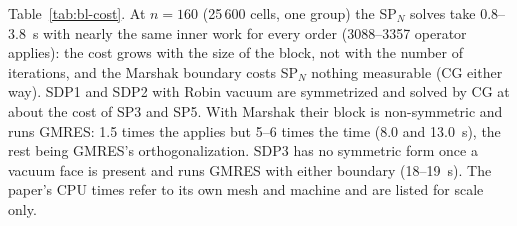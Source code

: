 Table~\ref{tab:bl-cost}. At $n = 160$ (25\,600 cells, one group) the SP$_N$
solves take 0.8--3.8~s with nearly the same inner work for every order
(3088--3357 operator applies): the cost grows with the size of the block,
not with the number of iterations, and the Marshak boundary costs SP$_N$
nothing measurable (CG either way). SDP1 and SDP2 with Robin vacuum are
symmetrized and solved by CG at about the cost of SP3 and SP5. With Marshak
their block is non-symmetric and runs GMRES: 1.5 times the applies but 5--6
times the time (8.0 and 13.0~s), the rest being GMRES's orthogonalization.
SDP3 has no symmetric form once a vacuum face is present and runs GMRES with
either boundary (18--19~s). The paper's CPU times refer to its own mesh and
machine and are listed for scale only.
